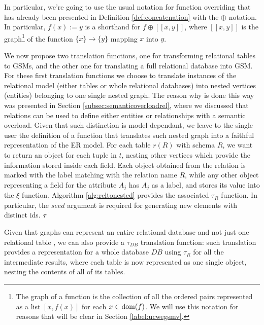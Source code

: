 In particular, we're going to use the usual notation for function overriding \cite{Nielson05} that has already been presented in Definition \vref{def:concatenation} with the $\oplus$ notation. In particular, $f(x):=y$ is a shorthand for $f\oplus [[x, y]]$, where $[[x, y]]$ is the  graph\footnote{The graph of a function is the collection of all the ordered pairs represented as a list $[x,f(x)]$ for each $x\in\operatorname{dom}(f)$. We will use this notation for reasons that will be clear in Section \vref{label:ucwegsmv}.} of the function $\{x\}\to \{y\}$ mapping $x$ into $y$.



We now propose two translation functions, one for transforming relational tables to GSMs, and the other one for translating a full relational database into GSM. For these first translation functions we choose to translate instances of the relational model (either tables or whole relational databases) into nested vertices (entities) belonging to one single nested graph. The reason why is done this way was presented in Section \vref{subsec:semanticoverloadrel}, where we discussed that relations can be used to define either entities or relationships with a semantic overload. Given that such distinction is model dependant, we leave to the single user the definition of a function that translates such nested graph into a faithful representation of the ER model. For each table $r(R)$ with schema $R$, we want to return an object for each tuple in $t$, nesting other vertices which provide the information stored inside each field. Each object obtained from the relation is marked with the  label matching with the relation name $R$, while any other object representing a field for the attribute $A_j$ has $A_j$ as a label, and stores its value into the $\xi$ function.  Algorithm \vref{alg:reltonested} provides the associated $\tau_R$ function. In particular, the $seed$ argument is required for generating new elements with distinct ids. $\ttranslIndex{relational to Nested Graphs}$

Given that graphs can represent an entire relational database and
not just one relational table \cite{Fagin83,bergami2014}, we can also provide a $\tau_{DB}$ translation function: such translation provides a representation for a whole database $DB$ using $\tau_R$ for all the intermediate results, where each table is now represented as one single object, nesting the contents of all of its tables.


